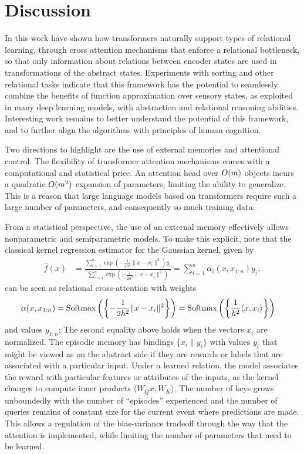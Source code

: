 \section{Discussion}
\label{sec:discuss}



In this work have shown how transformers naturally support types of relational learning, through cross attention mechanisms that enforce a relational bottleneck, so that only information about relations between encoder states 
are used in transformations of the abstract states. Experiments with sorting and other relational tasks indicate that this framework has the potential to seamlessly combine the benefits of function approximation over sensory states, as exploited in many deep learning models, with abstraction and relational reasoning abilities. Interesting 
work remains to better understand the potential of this framework, and to further align the algorithms with principles of human cognition.

Two directions to highlight are the use of external memories and attentional control. The flexibility of transformer attention mechanisms comes with a computational and statistical price. An attention head over 
$O(m)$ objects incurs a quadratic $O(m^2)$ expansion of parameters, limiting the ability to generalize. This is a reason that large language models based on transformers require such a large number of parameters, and consequently so much training data. 



From a statistical perspective, the use of an external memory effectively allows nonparametric and semiparametric models. To make this explicit, note that the classical kernel regression estimator for the Gaussian kernel,
given by
\begin{align*}
  \hat f(x) &= \frac{\sum_{i=1}^n \exp\left(-\frac{1}{2h^2} \|x-x_i\|^2\right) y_i}{\sum_{i=1}^n \exp\left(-\frac{1}{2h^2} \|x-x_i\|^2\right)} 
  = \sum_{i=1}^n \alpha_i(x, x_{1:n}) y_i,
\end{align*}
can be seen as relational cross-attention with weights
\begin{align*}
    \alpha(x, x_{1:n}) &= \Softmax\left(\left\{-\frac{1}{2h^2}\|x-x_i\|^2\right\}\right) 
    = \Softmax\left(\left\{\frac{1}{h^2}\langle x, x_i\rangle\right\}\right)
\end{align*}
and values $y_{1:n}$; The second equality above holds when the vectors $x_i$ are normalized.
The episodic memory has bindings $\{x_i\| y_i\}$ with values $y_i$ that 
might be viewed as on the abstract side if they are rewards or labels that are associated with 
a particular input. Under a learned relation, the model associates the reward with particular features or attributes of the inputs, as the kernel changes to compute inner products $\langle W_Q x, W_K \rangle$. 
The number of keys grows unboundedly with the number of ``episodes'' experienced 
and the number of queries remains of constant size for the current event where predictions are made.
This allows a regulation of the bias-variance tradeoff through the way that the attention is implemented, 
while limiting the number of parameters that need to be learned.

